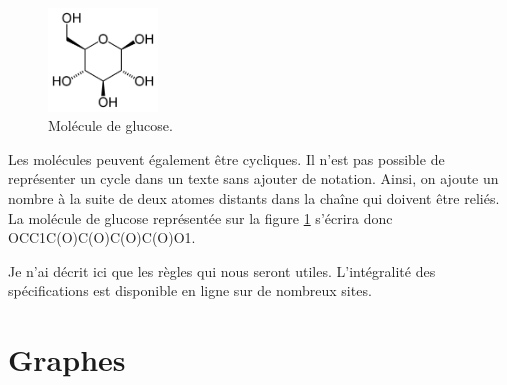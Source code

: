 \begin{figure}[h!]
  \begin{center}
    \includegraphics[width=110px]{Figures/Prerequis/glucose.png}
    \caption{\label{glucose}Molécule de glucose.}
  \end{center}
\end{figure}

Les molécules peuvent également être cycliques.
Il n'est pas possible de représenter un cycle dans un texte sans ajouter de notation.
Ainsi, on ajoute un nombre à la suite de deux atomes distants dans la chaîne qui doivent être reliés.
La molécule de glucose représentée sur la figure \ref{glucose} s'écrira donc OCC1C(O)C(O)C(O)C(O)O1.

Je n'ai décrit ici que les règles qui nous seront utiles.
L'intégralité des spécifications est disponible en ligne sur de nombreux sites.



\section{Graphes}





























